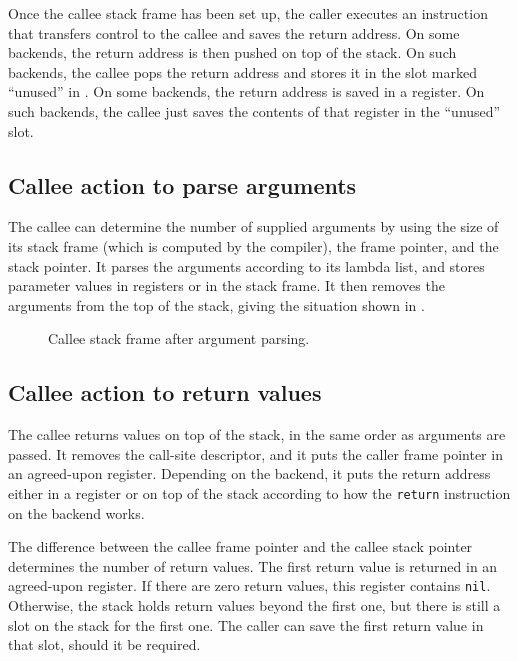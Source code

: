 Once the callee stack frame has been set up, the caller
executes an instruction that transfers control to the callee and saves
the return address.  On some backends, the return address is then
pushed on top of the stack.  On such backends, the callee pops the
return address and stores it in the slot marked ``unused'' in
.  On some backends, the return
address is saved in a register.  On such backends, the callee just
saves the contents of that register in the ``unused'' slot.

\subsection{Callee action to parse arguments}

The callee can determine the number of supplied arguments by using the
size of its stack frame (which is computed by the compiler), the frame
pointer, and the stack pointer.  It parses the arguments according to
its lambda list, and stores parameter values in registers or in the
stack frame.  It then removes the arguments from the top of the stack,
giving the situation shown in
.

\begin{figure}
\begin{center}
\end{center}
\caption{\label{fig-callee-stack-frame-after-argument-parsing}
Callee stack frame after argument parsing.}
\end{figure}

\subsection{Callee action to return values}

The callee returns values on top of the stack, in the same order as
arguments are passed.  It removes the call-site descriptor, and it
puts the caller frame pointer in an agreed-upon register.  Depending
on the backend, it puts the return address either in a register or on
top of the stack according to how the \texttt{return} instruction on
the backend works.

The difference between the callee frame pointer and the callee stack
pointer determines the number of return values.  The first return
value is returned in an agreed-upon register.  If there are zero
return values, this register contains \texttt{nil}.  Otherwise, the
stack holds return values beyond the first one, but there is still a
slot on the stack for the first one.  The caller can save the first
return value in that slot, should it be required.

